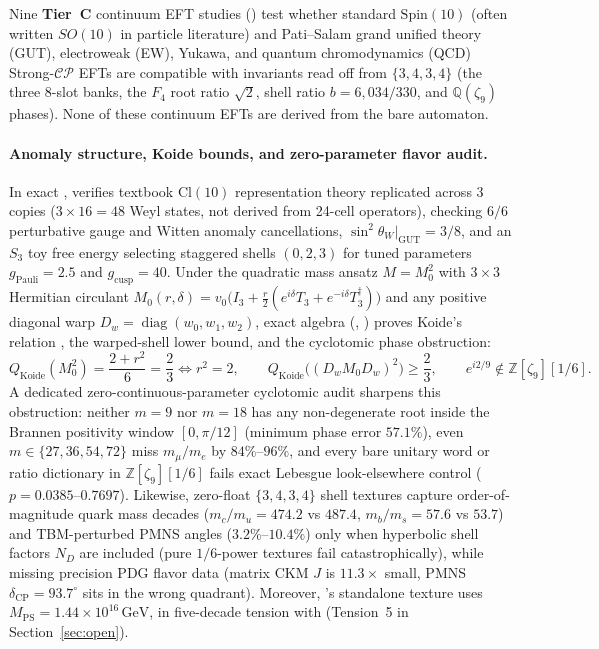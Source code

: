 Nine \textbf{Tier~C} continuum EFT studies () test whether standard $\mathrm{Spin}(10)$
\cite{georgi1975, fritzsch1975} (often written $SO(10)$ in particle literature) and Pati--Salam \cite{pati1974} grand
unified theory (GUT), electroweak (EW), Yukawa, and quantum chromodynamics (QCD) Strong-$\mathcal{CP}$ EFTs are
compatible with invariants read off from $\{3,4,3,4\}$ (the three 8-slot banks, the $F_4$ root ratio $\sqrt{2}$, shell
ratio $b = 6{,}034/330$, and $\mathbb{Q}(\zeta_9)$ phases). None of these continuum EFTs are derived from the bare
automaton.

\paragraph{Anomaly structure, Koide bounds, and zero-parameter flavor audit.}
In exact ,  verifies textbook $\mathrm{Cl}(10)$ representation theory replicated across 3
copies ($3 \times 16 = 48$ Weyl states, not derived from 24-cell operators), checking $6/6$ perturbative gauge and
Witten anomaly cancellations, $\sin^2\theta_W|_{\mathrm{GUT}} = 3/8$, and an $S_3$ toy free energy selecting staggered
shells $(0, 2, 3)$ for tuned parameters $g_{\mathrm{Pauli}} = 2.5$ and $g_{\mathrm{cusp}} = 40$. Under the quadratic
mass ansatz $M = M_0^2$ with $3 \times 3$ Hermitian circulant
$M_0(r, \delta) = v_0\bigl(I_3 + \frac{r}{2}(e^{i\delta} T_3 + e^{-i\delta} T_3^\dagger)\bigr)$ and any positive
diagonal warp $D_w = \operatorname{diag}(w_0, w_1, w_2)$, exact algebra (, ) proves
Koide's relation \cite{koide1983}, the warped-shell lower bound, and the cyclotomic phase obstruction:
\begin{equation}
Q_{\mathrm{Koide}}(M_0^2) = \frac{2 + r^2}{6} = \frac{2}{3} \iff r^2 = 2,
\qquad
Q_{\mathrm{Koide}}\bigl((D_w M_0 D_w)^2\bigr) \ge \frac{2}{3},
\qquad
e^{i 2/9} \notin \mathbb{Z}[\zeta_9][1/6].
\label{eq:koide-identities}
\end{equation}
A dedicated zero-continuous-parameter cyclotomic audit sharpens this obstruction: neither $m = 9$ nor $m = 18$ has any
non-degenerate root inside the Brannen positivity window $[0, \pi/12]$ (minimum phase error $57.1\%$), even
$m \in \{27, 36, 54, 72\}$ miss $m_\mu / m_e$ by $84\%\text{--}96\%$, and every bare unitary word or ratio dictionary in
$\mathbb{Z}[\zeta_9][1/6]$ fails exact Lebesgue look-elsewhere control ($p = 0.0385\text{--}0.7697$). Likewise,
zero-float $\{3,4,3,4\}$ shell textures capture order-of-magnitude quark mass decades ($m_c/m_u = 474.2$ vs $487.4$,
$m_b/m_s = 57.6$ vs $53.7$) and TBM-perturbed PMNS angles ($3.2\%\text{--}10.4\%$) only when hyperbolic shell factors
$N_D$ are included (pure $1/6$-power textures fail catastrophically), while missing precision PDG flavor data (matrix
CKM $J$ is $11.3\times$ small, PMNS $\delta_{\mathrm{CP}} = 93.7^\circ$ sits in the wrong quadrant). Moreover,
's standalone texture uses $M_{\mathrm{PS}} = 1.44 \times 10^{16}\,\mathrm{GeV}$, in five-decade
tension with  (Tension~5 in Section~\ref{sec:open}).

